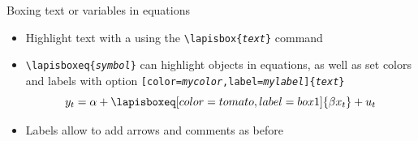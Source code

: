 \documentclass[10pt,itemsep]{beamer}
\begin{document}
\begin{frame}
    {Boxing text or variables in equations}
    \begin{itemize}
        \item Highlight text with a  using the \texttt{\textbackslash lapisbox\{\textit{text}\}} command\bigskip\medskip
        \pause
        \item \texttt{\textbackslash lapisboxeq\{\textit{symbol}\}} can highlight objects in equations, as well as set colors and labels with option \texttt{[color=\textit{mycolor},label=\textit{mylabel}]\{\textit{text}\}}
        \begin{equation*}
            y_{t} = \a + \lapisboxeq[color=tomato,label=box1]{\b x_t} + u_{t} \vspace{-.3cm}
        \end{equation*}
        \pause
        \item Labels allow to add arrows and comments as before
    \end{itemize}
\end{frame} 
\shownotesblock{}
\end{document}
